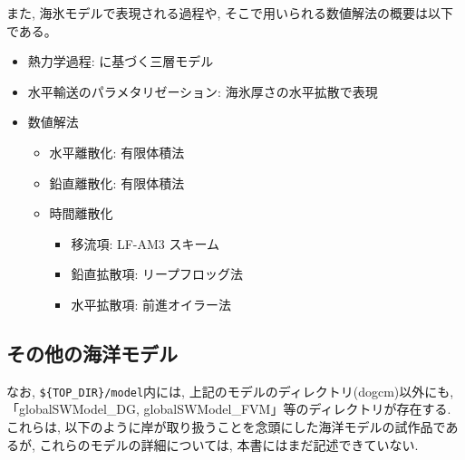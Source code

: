 また, 海氷モデルで表現される過程や, そこで用いられる数値解法の概要は以下である。
\begin{itemize}
  \item 熱力学過程: \citep{winton2000reformulated}に基づく三層モデル
  \item 水平輸送のパラメタリゼーション: 海氷厚さの水平拡散で表現
  \item 数値解法
  \begin{itemize}
    \item 水平離散化: 有限体積法
    \item 鉛直離散化: 有限体積法
    \item 時間離散化
    \begin{itemize}  
      \item 移流項: LF-AM3 スキーム \citep{shchepetkin2005regional}
  	  \item 鉛直拡散項: リープフロッグ法
  	  \item 水平拡散項: 前進オイラー法
    \end{itemize}                  
  \end{itemize}
\end{itemize}

\subsection*{その他の海洋モデル}

なお, \verb|${TOP_DIR}/model|内には, 上記のモデルのディレクトリ(dogcm)以外にも, 
「globalSWModel\_DG, globalSWModel\_FVM」等のディレクトリが存在する. 
これらは, 以下のように岸が取り扱うことを念頭にした海洋モデルの試作品であるが, 
これらのモデルの詳細については, 本書にはまだ記述できていない.  



